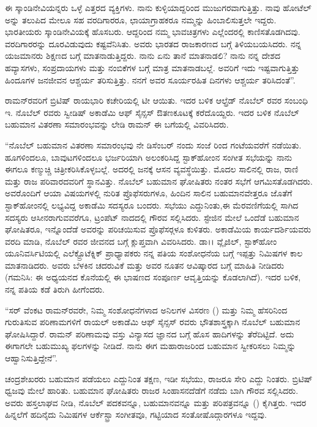 ಈ ಸ್ಕಾಂಡಿನೇವಿಯನ್ನರು ಒಳ್ಳೆ ಎತ್ತರದ ವ್ಯಕ್ತಿಗಳು. ನಾನು ಕುಳ್ಳಿಯಾದ್ದರಿಂದ ಮುಜುಗರವಾಗುತ್ತಿತ್ತು. ನಾವು ಹೋಟೆಲ್ ಅನ್ನು ತಲುಪಿದ ಮೇಲೂ ಸಹ ವರದಿಗಾರರೂ, ಛಾಯಾಗ್ರಾಹಕರೂ ನಮ್ಮನ್ನು ಹಿಂಬಾಲಿಸುತ್ತಲೇ ಇದ್ದರು. ಭಾರತೀಯರು ಸ್ಕಾಂಡಿನೇವಿಯಕ್ಕೆ ಹೊಸಬರು. ಆದ್ದರಿಂದ ನಮ್ಮ ಭಾವಚಿತ್ರಗಳು ಎಲ್ಲೆಂದರಲ್ಲಿ ಕಾಣಿಸತೊಡಗಿದವು. ವರದಿಗಾರರನ್ನು ದೂರವಿಡುವುದು ಕಷ್ಟವೆನಿಸಿತು. ಅವರು ಭಾರತದ ರಾಜಕಾರಣದ ಬಗ್ಗೆ ತಿಳಿಯಬಯಸಿದರು. ನನ್ನ ಯಜಮಾನರು ಶಿಕ್ಷಣದ ಬಗ್ಗೆ ಮಾತನಾಡುತ್ತಿದ್ದರು. ನಾನು ಏನು ತಾನೆ ಮಾತನಾಡಲಿ? ನಾನು ನನ್ನ ದೇಶದ ಹವ್ಯಾಸಗಳು, ಸಂಪ್ರದಾಯಗಳು ಮತ್ತು ನಂಬಿಕೆಗಳ ಬಗ್ಗೆ ಮಾತ್ರ ಮಾತನಾಡಬಲ್ಲೆ. ಅವರಿಗೆ ಇದು ಇಷ್ಟವಾಗುತ್ತಿತ್ತು ಹಿಂದೂಗಳ ಜನಜೀವನ ಆಶ್ಚರ್ಯ ತರಿಸುತ್ತಿತ್ತು. ನನಗೆ ಅವರ ಸೂರ್ಯರಹಿತ ದಿನಗಳು ಆಶ್ಚರ್ಯ ತರಿಸಿದಂತೆ”.

ರಾಮನ್‍ರವರಿಗೆ ಬ್ರಿಟಿಷ್ ರಾಯಭಾರಿ ಕಚೇರಿಯಲ್ಲಿ ಟೀ ಆಯಿತು. ಇದರ ಬಳಿಕ ಆಲ್ಫ್ರೆಡ್ ನೊಬೆಲ್ ರವರ ಸಂಬಂಧಿ ಇ. ನೊಬೆಲ್ ರವರು ಸ್ವೀಡಿಷ್ ಅಕಾಡೆಮಿ ಆಫ್ ಸೈನ್ಸಸ್ ಔತಣಕೂಟಕ್ಕೆ ಕರೆದೊಯ್ದರು. ಇದರ ಬಳಿಕ ನೊಬೆಲ್ ಬಹುಮಾನ ವಿತರಣಾ ಸಮಾರಂಭವನ್ನು ಲೇಡಿ ರಾಮನ್ ಈ ಬಗೆಯಲ್ಲಿ ವಿವರಿಸಿದರು.

\enginline{-}“ನೊಬೆಲ್ ಬಹುಮಾನ ವಿತರಣಾ ಸಮಾರಂಭವು ನೇ ಡಿಸೆಂಬರ್ ನಂದು ಸಂಜೆ  ರಿಂದ  ಗಂಟೆಯವರೆಗೆ ನಡೆಯಿತು. ಹೂಗಳಿಂದಲೂ, ಬಾವುಟಗಳಿಂದಲೂ ಭರ್ಜರಿಯಾಗಿ ಅಲಂಕರಿಸಿದ್ದ ಸ್ಟಾಕ್‍ಹೋಂನ ಸಂಗೀತ ಸಭೆಯನ್ನು ನಾನು ಈಗಲೂ ಕಣ್ಮುಚ್ಚಿ ಚಿತ್ರೀಕರಿಸಿಕೊಳ್ಳಬಲ್ಲೆ. ಅದರಲ್ಲಿ  ಜನಕ್ಕೆ ಆಸನ ವ್ಯವಸ್ಥೆಯಿತ್ತು. ಮೊದಲ ಸಾಲಿನಲ್ಲಿ ರಾಜ, ರಾಣಿ ಮತ್ತು ರಾಜ ಪರಿವಾರದವರಿಗೆ ಸ್ಥಾನವಿತ್ತು. ನೊಬೆಲ್ ಬಹುಮಾನ ಘೋಷಿತರು ನಂತರ ಸಭೆಗೆ ಆಗಮಿಸತೊಡಗಿದರು. ಅವರೊಂದಿಗೆ ಆಯಾ ವಿಷಯಗಳಲ್ಲಿ ನುರಿತ ಪ್ರೊಫೆಸರುಗಳೂ, ಹಿಂದಿನ ಸಾಲಿನ ಬಹುಮಾನವೇತ್ತರೂ ಜೊತೆಗೆ ಸ್ಟಾಕ್‍ಹೋಂನಲ್ಲಿ ಲಭ್ಯವಿದ್ದ ಅಕಾಡೆಮಿ ಸದಸ್ಯರೂ ಬಂದರು. ಸಭೆಯು ಎದ್ದುನಿಂತು,\break ಈ ಮೆರವಣಿಗೆಯಲ್ಲಿ ಸಾಗಿದ ಸದಸ್ಯರು ಆಸೀನರಾಗುವವರೆಗೂ, ಟ್ರಂಪೆಟ್ ನಾದದಲ್ಲಿ ಗೌರವ ಸಲ್ಲಿಸಿದರು. ಸ್ಟೇಜಿನ ಮೇಲೆ ಒಂದೆಡೆ ಬಹುಮಾನ ಘೋಷಿತರೂ, ಇನ್ನೊಂದೆಡೆ ಅವರನ್ನು ಪರಿಚಯಿಸುವ ಪ್ರೊಫೆಸರ್‍ಗಳೂ ಕುಳಿತರು. ಅಕಾಡೆಮಿಯ ಕಾರ್ಯದರ್ಶಿಯವರು ವರದಿ ಮಾಡಿ, ನೊಬೆಲ್ ರವರ ಜೀವನದ ಬಗ್ಗೆ ಕ್ಲುಪ್ತವಾಗಿ ವಿವರಿಸಿದರು. ಡಾ।। ವ್ಲೈಜಿಲ್, ಸ್ಟಾಕ್‍ಹೋಂ ಯೂನಿವರ್ಸಿಟಿಯಲ್ಲಿ ಎಲೆಕ್ಟ್ರೊಟೆಕ್ನಿಕ್ ಪ್ರಾಧ್ಯಾಪಕರು ನನ್ನ ಪತಿಯ ಸಂಶೋಧನೆಯ ಬಗ್ಗೆ ಇಪ್ಪತ್ತು ನಿಮಿಷಗಳ ಕಾಲ ಮಾತನಾಡಿದರು. ಅವರು ಬೆಳಕಿನ ಚದರುವಿಕೆ ಮತ್ತು ಅವರ ನೂತನ ಆವಿಷ್ಕಾರದ ಬಗ್ಗೆ ಮಾಹಿತಿ ನೀಡಿದರು (ಗಮನಿಸಿ: ಈ ಅಧ್ಯಯನದ ಕೊನೆಯಲ್ಲಿ ಈ ಭಾಷಣದ ಸಂಪೂರ್ಣ ಆವೃತ್ತಿಯನ್ನು ಕೊಡಲಾಗಿದೆ). ಇದರ ಬಳಿಕ, ನನ್ನ ಪತಿಯ ಕಡೆ ತಿರುಗಿ ಹೀಗೆಂದರು.

“ಸರ್ ವೆಂಕಟ ರಾಮನ್‍ರವರೇ, ನಿಮ್ಮ ಸಂಶೋಧನೆಗಳಾದ ಅನಿಲಗಳ ವಿಸರಣ () ಮತ್ತು ನಿಮ್ಮ ಹೆಸರಿನಿಂದ ಗುರುತಿಸುವ ಪರಿಣಾಮಗಳಿಗೆ ರಾಯಲ್ ಅಕಾಡೆಮಿ ಆಫ್ ಸೈನ್ಸಸ್ ರವರು ಭೌತಶಾಸ್ತ್ರಕ್ಕಾಗಿ ನೊಬೆಲ್ ಬಹುಮಾನ ಘೋಷಿಸಿದ್ದಾರೆ. ರಾಮನ್ ಪರಿಣಾಮವು ವಸ್ತು ವಿನ್ಯಾಸದ ಜ್ಞಾನದ ಬಗ್ಗೆ ಹೊಸ ಹಾದಿಗಳನ್ನು ತೆರೆದಿಟ್ಟಿದೆ. ಅದು ಈಗಾಗಲೇ ಬಹುಮುಖ್ಯ ಫಲಗಳನ್ನು ನೀಡಿದೆ. ನಾನು ಈಗ ಮಹಾರಾಜರಿಂದ ಬಹುಮಾನ ಸ್ವೀಕರಿಸಲು ನಿಮ್ಮನ್ನು ಆಹ್ವಾನಿಸುತ್ತಿದ್ದೇನೆ”.

\vskip 1pt

ಚಂದ್ರಶೇಖರರು ಬಹುಮಾನ ಪಡೆಯಲು ಎದ್ದುನಿಂತ ತಕ್ಷಣ, ಇಡೀ ಸಭೆಯು, ರಾಜರೂ ಸೇರಿ ಎದ್ದು ನಿಂತರು. ಬ್ರಿಟಿಷ್ ಧ್ವಜವು ಮೇಲೆ ಹಾರಿತು. ಬಹುಮಾನ ಘೋಷಿತರು ರಾಜರ ಸಿಂಹಾಸನದೆಡೆಗೆ ನಡೆದು ಬಾಗಿ ಗೌರವ ಸಲ್ಲಿಸಿದರು. ಅವರು ಹಸ್ತಲಾಘವ ನೀಡಿ, ನೊಬೆಲ್ ಪದಕವನ್ನೂ, ಬಹುಮಾನವನ್ನೂ ಮತ್ತು ಪರಿಪತ್ರವನ್ನೂ () ಕೈಗಿತ್ತರು. ಇದರ ಹಿನ್ನಲೆಗೆ ಹದಿನೈದು ನಿಮಿಷಗಳ ಆರ್ಕೆಸ್ಟ್ರಾ ಸಂಗೀತವೂ, ಗಟ್ಟಿಯಾದ ಸಂತೋಷೊದ್ಗಾರಗಳೂ ಇದ್ದವು.

